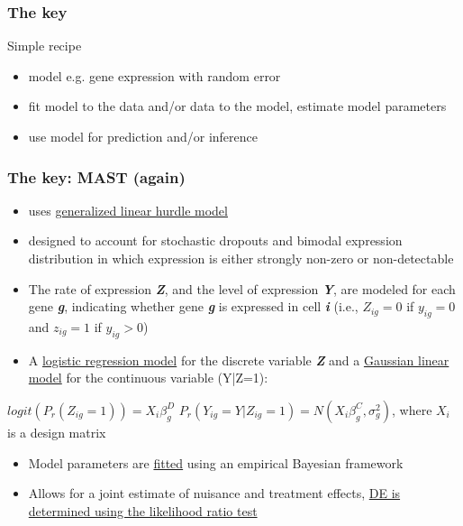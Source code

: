 \documentclass{beamer}\usepackage[]{graphicx}\usepackage[]{color}
\begin{document}
\begin{frame}
\frametitle{The key}
\begin{block}{Simple recipe}
\begin{itemize}
\item model e.g. gene expression with random error
\item fit model to the data and/or data to the model, estimate model parameters
\item use model for prediction and/or inference
\end{itemize}
\end{block}
\end{frame}

\begin{frame}
\frametitle{The key: MAST (again)}
\begin{itemize}
  \item uses \underline{generalized linear hurdle model}
  \item designed to account for stochastic dropouts and bimodal expression distribution in which expression is either strongly non-zero or non-detectable
  \item The rate of expression \textbf{\textit{Z}}, and the level of expression \textbf{\textit{Y}}, are modeled for each gene \textbf{\textit{g}}, indicating whether gene \textbf{\textit{g}} is expressed in cell \textbf{\textit{i}} (i.e., $Z_{ig}=0$ if $y_{ig}=0$ and $z_{ig}=1$ if $y_{ig}>0$)
  \item A \underline{logistic regression model} for the discrete variable \textbf{\textit{Z}} and a \underline{Gaussian linear model} for the continuous variable (Y|Z=1):
   \end{itemize}
   \begin{center}
    $logit (P_r(Z_{ig}=1))=X_i\beta_g^D$ \newline
    $P_r(Y_{ig}=Y|Z_{ig}=1)=N(X_i\beta_g^C,\sigma_g^2)$, where $X_i$ is a design matrix
\end{center}
\begin{itemize}
\item Model parameters are \underline{fitted} using an empirical Bayesian framework
\item Allows for a joint estimate of nuisance and treatment effects, \underline{DE is determined using the likelihood ratio test}
\end{itemize}
\end{frame}
\end{document}
